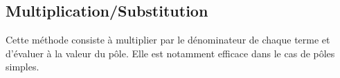 \subsection{Multiplication/Substitution}
Cette méthode consiste à multiplier par le dénominateur de chaque terme et 
d'évaluer à la valeur du pôle. Elle est notamment efficace dans le cas de pôles
simples.
\exemple

